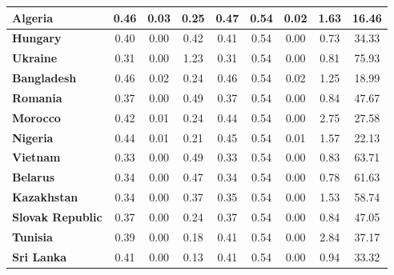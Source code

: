 \begin{small}
\begin{tabular}{|l|c|c|c|c|c|c|c|c|}
\textbf{Algeria}&0.46&0.03&0.25&0.47&0.54&0.02&1.63&16.46\\\hline
\textbf{Hungary}&0.40&0.00&0.42&0.41&0.54&0.00&0.73&34.33\\\hline
\textbf{Ukraine}&0.31&0.00&1.23&0.31&0.54&0.00&0.81&75.93\\\hline
\textbf{Bangladesh}&0.46&0.02&0.24&0.46&0.54&0.02&1.25&18.99\\\hline
\textbf{Romania}&0.37&0.00&0.49&0.37&0.54&0.00&0.84&47.67\\\hline
\textbf{Morocco}&0.42&0.01&0.24&0.44&0.54&0.00&2.75&27.58\\\hline
\textbf{Nigeria}&0.44&0.01&0.21&0.45&0.54&0.01&1.57&22.13\\\hline
\textbf{Vietnam}&0.33&0.00&0.49&0.33&0.54&0.00&0.83&63.71\\\hline
\textbf{Belarus}&0.34&0.00&0.47&0.34&0.54&0.00&0.78&61.63\\\hline
\textbf{Kazakhstan}&0.34&0.00&0.37&0.35&0.54&0.00&1.53&58.74\\\hline
\textbf{Slovak Republic}&0.37&0.00&0.24&0.37&0.54&0.00&0.84&47.05\\\hline
\textbf{Tunisia}&0.39&0.00&0.18&0.41&0.54&0.00&2.84&37.17\\\hline
\textbf{Sri Lanka}&0.41&0.00&0.13&0.41&0.54&0.00&0.94&33.32\\\hline
\end{tabular}
\end{small}